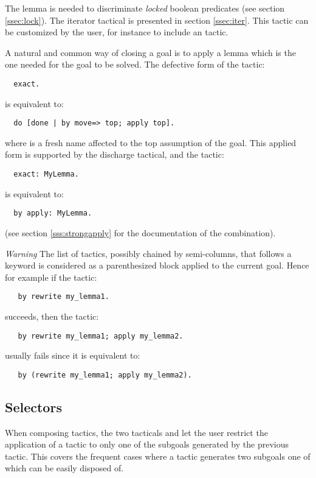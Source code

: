 The lemma  is needed to discriminate
\emph{locked} boolean predicates (see section \ref{ssec:lock}).
The iterator tactical  is presented in section
\ref{ssec:iter}.
This tactic can be customized by the user, for instance to include an
 tactic.

A natural and common way of closing a goal is to apply a lemma which
is the  one needed for the goal to be solved. The defective
form of the tactic:
\begin{lstlisting}
  exact.
\end{lstlisting}
is equivalent to:
\begin{lstlisting}
  do [done | by move=> top; apply top].
\end{lstlisting}
where  is a fresh name affected to the top assumption of the goal.
This applied form is supported by the  \C{:} discharge tactical, and
the tactic:
\begin{lstlisting}
  exact: MyLemma.
\end{lstlisting}
is equivalent to:
\begin{lstlisting}
  by apply: MyLemma.
\end{lstlisting}
(see section \ref{sss:strongapply} for the documentation of the 
combination).

\textit{Warning} The list of tactics, possibly chained by
semi-columns, that follows a  keyword is considered as a
parenthesized block
applied to the current goal. Hence for example if the tactic:
\begin{lstlisting}
   by rewrite my_lemma1.
\end{lstlisting}
succeeds, then the tactic:
\begin{lstlisting}
   by rewrite my_lemma1; apply my_lemma2.
\end{lstlisting}
usually fails since it is equivalent to:
\begin{lstlisting}
   by (rewrite my_lemma1; apply my_lemma2).
\end{lstlisting}

\subsection{Selectors}\label{ssec:select}

When composing tactics, the two tacticals  and
 let the user restrict the application of a tactic to only one
of the subgoals generated by the previous tactic. This
covers the frequent cases where a tactic generates two subgoals one of
which can be easily disposed of.

